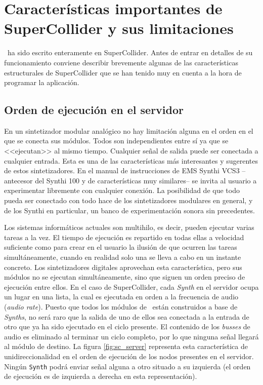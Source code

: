 \section[Características de SuperCollider]{Características importantes de SuperCollider y sus limitaciones}
\label{sec:sc_features}

\appName~ha sido escrito enteramente en SuperCollider. Antes de entrar en detalles de su funcionamiento conviene describir brevemente algunas de las características estructurales de SuperCollider que se han tenido muy en cuenta a la hora de programar la aplicación.

\subsection{Orden de ejecución en el servidor}
En un sintetizador modular analógico no hay limitación alguna en el orden en el que se conecta sus módulos. Todos son independientes entre sí ya que se <<ejecutan>> al mismo tiempo. Cualquier señal de salida puede ser conectada a cualquier entrada. Esta es una de las características más interesantes y sugerentes de estos sintetizadores. En el manual de instrucciones de EMS Synthi VCS3 \cite{SynthiVCS3_brochure}  --antecesor del Synthi 100 y de características muy similares-- se invita al usuario a experimentar libremente con cualquier conexión. La posibilidad de que todo pueda ser conectado con todo hace de los sintetizadores modulares en general, y de los Synthi en particular, un banco de experimentación sonora sin precedentes.

Los sistemas informáticos actuales son multihilo, es decir, pueden ejecutar varias tareas a la vez. El tiempo de ejecución es repartido en todas ellas a velocidad suficiente como para crear en el usuario la ilusión de que ocurren las tareas simultáneamente, cuando en realidad solo una se lleva a cabo en un instante concreto. Los sintetizadores digitales aprovechan esta característica, pero sus módulos no se ejecutan simultáneamente, sino que siguen un orden preciso de ejecución entre ellos. En el caso de SuperCollider, cada \textit{Synth} en el servidor ocupa un lugar en una lista, la cual es ejecutada en orden a la frecuencia de audio (\textit{audio rate}). Puesto que todos los módulos de \appName~están construidos a base de \textit{Synths}, no será raro que la salida de uno de ellos sea conectada a la entrada de otro que ya ha sido ejecutado en el ciclo presente. El contenido de los \textit{busses} de audio es eliminado al terminar un ciclo completo, por lo que ninguna señal llegará al módulo de destino. La figura \ref{fig:sc_server} representa esta característica de unidireccionalidad en el orden de ejecución de los nodos presentes en el servidor. Ningún \texttt{Synth} podrá enviar señal alguna a otro situado a su izquierda (el orden de ejecución es de izquierda a derecha en esta representación).

